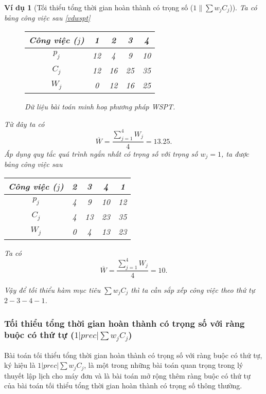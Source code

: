 \documentclass[12pt,a4paper]{report}
\newtheorem{vd}{Ví dụ}
\begin{document}
\begin{vd}[Tối thiểu tổng thời gian hoàn thành có trọng số ($1 \| \sum w_j C_j$)]
Ta có bảng công việc sau \eqref{vdwspt}

\begin{figure}[h!]
	\centering
	\begin{tabular}{|c | c c c c |} 
	\hline
	Công việc ($j$) & 1 & 2 & 3 & 4 \\
	\hline\hline
	$p_j$ & 12 & 4 & 9 & 10 \\
	$C_j$ & 12 & 16 & 25 & 35 \\
	$W_j$ & 0 & 12 & 16 & 25 \\
	\hline
	\end{tabular}
\caption{\label{vdwspt} Dữ liệu bài toán minh hoạ phương pháp WSPT.}
\end{figure}

Từ đây ta có
\begin{equation*}
\overline{W}=\frac{\sum_{j=1}^{4}W_j}{4} = 13.25.
\end{equation*}
Áp dụng quy tắc quá trình ngắn nhất có trọng số với trọng số $w_j=1$, ta được bảng công việc sau
\begin{table}[h!]
	\centering
	\begin{tabular}{|c | c c c c |} 
	\hline
	Công việc ($j$) & 2 & 3 & 4 & 1 \\
	\hline\hline
	$p_j$ & 4 & 9 & 10 & 12 \\
	$C_j$ & 4 & 13 & 23 & 35 \\
	$W_j$ & 0 & 4 & 13 & 23 \\
	\hline
	\end{tabular}
\end{table}

Ta có
\begin{equation*}
\overline{W}=\frac{\sum_{j=1}^{4}W_j}{4} = 10.
\end{equation*}

Vậy để tối thiểu hàm mục tiêu $\sum w_j C_j$ thì ta cần sắp xếp công việc theo thứ tự $2-3-4-1$.
\end{vd}

\subsubsection*{Tối thiểu tổng thời gian hoàn thành có trọng số với ràng buộc có thứ tự ($1 | prec | \sum w_j C_j$)}
Bài toán tối thiểu tổng thời gian hoàn thành có trọng số với ràng buộc có thứ tự, ký hiệu là $1|prec|\sum w_j C_j$, là một trong những bài toán quan trọng trong lý thuyết lập lịch cho máy đơn và là bài toán mở rộng thêm ràng buộc có thứ tự của bài toán tối thiểu tổng thời gian hoàn thành có trọng số thông thường.
\end{document}
